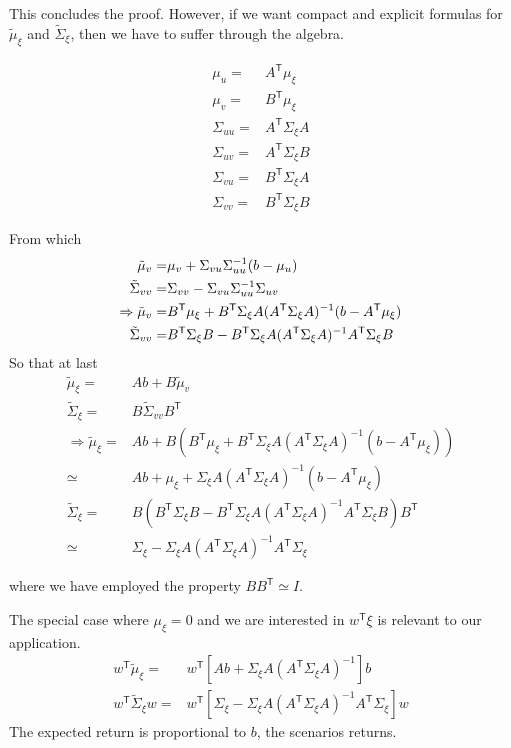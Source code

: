\documentclass[letter, 12pt]{article}
\newcommand{\transpose}{^\mathsf{T}}
\newcommand{\inv}{^{-1}}
\begin{document}
This concludes the proof. However, if we want compact and explicit formulas for $\tilde \mu_\xi$ and $\tilde \Sigma_{\xi}$, then we have to suffer through the algebra.

\begin{align*}
\mu_u = & A\transpose \mu_\xi\\
\mu_v = & B\transpose\mu_\xi\\
\Sigma_{uu} = & A\transpose \Sigma_\xi A \\
\Sigma_{uv} = & A\transpose \Sigma_\xi B\\
\Sigma_{vu} = & B\transpose \Sigma_\xi A\\
\Sigma_{vv} = & B\transpose \Sigma_\xi B
\end{align*}

From which
\begin{align*}
\tilde\mu_v=&\mu_v + \Sigma_{vu} \Sigma_{uu}\inv(b-\mu_u) \notag \\
\tilde\Sigma_{vv}=& \Sigma_{vv} - \Sigma_{vu} \Sigma_{uu}\inv \Sigma_{uv} \\
\Rightarrow
\tilde\mu_v=& B\transpose\mu_\xi + B\transpose \Sigma_\xi A (A\transpose \Sigma_\xi A )\inv(b-A\transpose \mu_\xi) \\
\tilde\Sigma_{vv}=& B\transpose \Sigma_\xi B - B\transpose \Sigma_\xi A ( A\transpose \Sigma_\xi A) \inv A\transpose \Sigma_\xi B
\end{align*}
So that at last
\begin{align*}
\tilde \mu_\xi=& Ab + B \tilde\mu_v \\
\tilde \Sigma_{\xi}= & B\tilde\Sigma_{vv} B\transpose \\
\Rightarrow
\tilde\mu_\xi = & Ab + B(B\transpose\mu_\xi + B\transpose \Sigma_\xi A (A\transpose \Sigma_\xi A )\inv(b-A\transpose \mu_\xi))\\
\simeq & Ab + \mu_\xi + \Sigma_\xi A (A\transpose \Sigma_\xi A )\inv(b-A\transpose \mu_\xi) \\
\tilde \Sigma_{\xi} = & B (B\transpose \Sigma_\xi B - B\transpose \Sigma_\xi A ( A\transpose \Sigma_\xi A) \inv A\transpose \Sigma_\xi B) B\transpose\\
\simeq & \Sigma_\xi - \Sigma_\xi A ( A\transpose \Sigma_\xi A) \inv A\transpose \Sigma_\xi
\end{align*}

where we have employed the property $B B\transpose \simeq I$.

The special case where $\mu_\xi=0$ and we are interested in $w\transpose \xi$ is relevant to our application.
\begin{align*}
w\transpose \tilde\mu_\xi = & w\transpose [A b + \Sigma_\xi A (A\transpose \Sigma_\xi A)\inv] b\\
w\transpose \tilde \Sigma_{\xi} w = & w\transpose [ \Sigma_\xi - \Sigma_\xi A ( A\transpose \Sigma_\xi A) \inv A\transpose \Sigma_\xi ] w
\end{align*}
The expected return is proportional to $b$, the scenarios returns.
%
%
\end{document}

